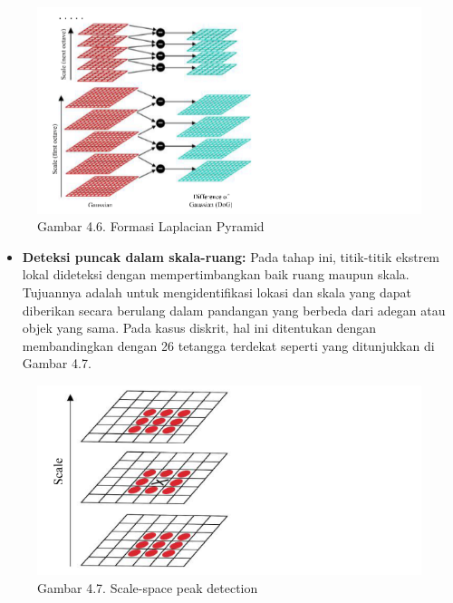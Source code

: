 \documentclass[
  letterpaper,
  DIV=11,
  numbers=noendperiod]{scrreprt}
\providecommand{\tightlist}{%
  \setlength{\itemsep}{0pt}\setlength{\parskip}{0pt}}\usepackage{longtable,booktabs,array}
\begin{document}
\begin{figure}

{\centering \includegraphics{Asset/image18.png}

}

\caption{Gambar 4.6. Formasi Laplacian Pyramid}

\end{figure}

\begin{itemize}
\tightlist
\item
  \textbf{Deteksi puncak dalam skala-ruang:} Pada tahap ini, titik-titik
  ekstrem lokal dideteksi dengan mempertimbangkan baik ruang maupun
  skala. Tujuannya adalah untuk mengidentifikasi lokasi dan skala yang
  dapat diberikan secara berulang dalam pandangan yang berbeda dari
  adegan atau objek yang sama. Pada kasus diskrit, hal ini ditentukan
  dengan membandingkan dengan 26 tetangga terdekat seperti yang
  ditunjukkan di Gambar 4.7.
\end{itemize}

\begin{figure}

{\centering \includegraphics{Asset/image19.png}

}

\caption{Gambar 4.7. Scale-space peak detection}

\end{figure}
\end{document}
